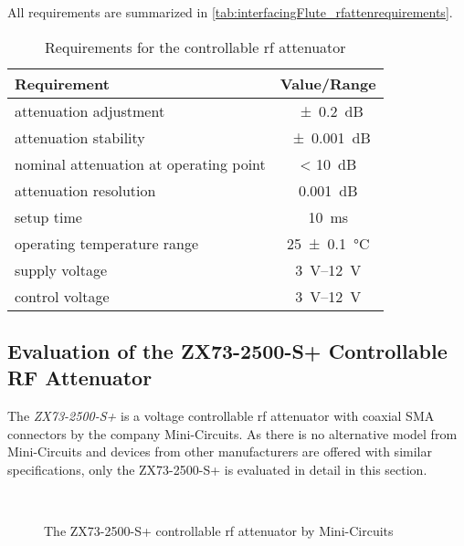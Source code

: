 All requirements are summarized in \autoref{tab:interfacingFlute_rfattenrequirements}.

\begin{table}[tbh]
\caption{Requirements for the controllable \gls{rf} attenuator}
\label{tab:interfacingFlute_rfattenrequirements}
\centering
\begin{tabular}{lc}
\toprule
Requirement & {Value/Range}\\
\midrule
attenuation adjustment & \SI{\pm0.2}{\dB}\\
attenuation stability & \SI{\pm0.001}{\dB}\\
nominal attenuation at operating point & < \SI{10}{\dB}\\
attenuation resolution & \SI{0.001}{\dB}\\
setup time & \SI{10}{\milli\second}\\
operating temperature range & \SI{25\pm0.1}{\celsius}\\
supply voltage & \SIrange{3}{12}{\volt}\\
control voltage & \SIrange{3}{12}{\volt}\\
\bottomrule
\end{tabular}
\end{table}

\subsection{Evaluation of the ZX73-2500-S+ Controllable RF Attenuator}
The \textit{ZX73-2500-S+} is a voltage controllable \gls{rf} attenuator with coaxial SMA connectors by the company Mini-Circuits. As there is no alternative model from Mini-Circuits and devices from other manufacturers are offered with similar specifications, only the ZX73-2500-S+ is evaluated in detail in this section.



\begin{figure}[tb]
    \centering
		\\
		\caption[The controllable attenuator]{The ZX73-2500-S+ controllable \gls{rf} attenuator by Mini-Circuits}
    \label{fig:attenPhotoAndEquiC}
\end{figure}

